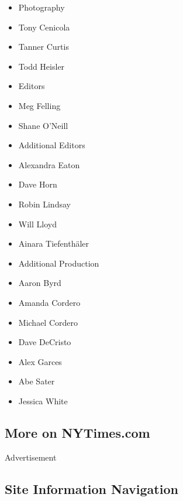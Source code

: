 \begin{itemize}
\tightlist
\item
  Photography
\item
  Tony Cenicola
\item
  Tanner Curtis
\item
  Todd Heisler
\end{itemize}

\begin{itemize}
\tightlist
\item
  Editors
\item
  Meg Felling
\item
  Shane O'Neill
\end{itemize}

\begin{itemize}
\tightlist
\item
  Additional Editors
\item
  Alexandra Eaton
\item
  Dave Horn
\item
  Robin Lindsay
\item
  Will Lloyd
\item
  Ainara Tiefenthäler
\end{itemize}

\begin{itemize}
\tightlist
\item
  Additional Production
\item
  Aaron Byrd
\item
  Amanda Cordero
\item
  Michael Cordero
\item
  Dave DeCristo
\item
  Alex Garces
\item
  Abe Sater
\item
  Jessica White
\end{itemize}

\hypertarget{more-on-nytimescom}{%
\subsection{More on NYTimes.com}\label{more-on-nytimescom}}

Advertisement

\hypertarget{site-information-navigation}{%
\subsection{Site Information
Navigation}\label{site-information-navigation}}

